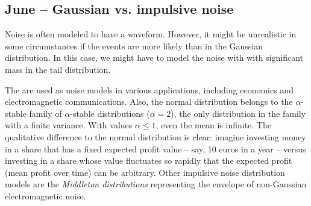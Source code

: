 \documentclass{article}
\begin{document}











\subsection{June – Gaussian vs. impulsive noise}


Noise is often modeled to have a  waveform. However, it might be unrealistic in some circumstances if the  events are more likely than in the Gaussian distribution. In this case, we might have to model the noise with  with significant mass in the tail distribution. 

The  are used as noise models in various applications, including economics and electromagnetic communications. Also, the normal distribution belongs to the $\alpha$-stable family of $\alpha$-stable distributions ($\alpha = 2$), the only distribution in the family with a finite variance. With values $\alpha \leq 1$, even the mean is infinite. The qualitative difference to the normal distribution is clear: imagine investing money in a share that has a fixed expected profit value – say, 10 euros in a year – versus investing in a share whose value fluctuates so rapidly that the expected profit (mean profit over time) can be arbitrary. Other impulsive noise distribution models are the \textit{Middleton distributions} representing the envelope of non-Gaussian electromagnetic noise.
\end{document}
